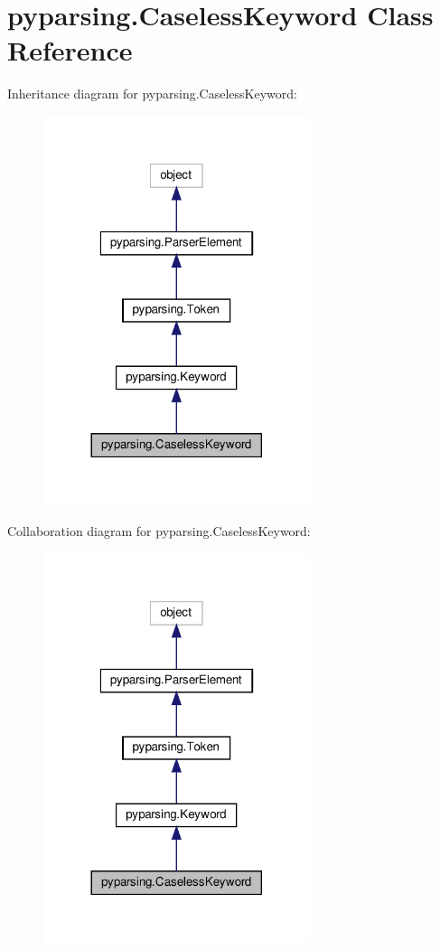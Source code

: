 \hypertarget{classpyparsing_1_1CaselessKeyword}{}\section{pyparsing.\+Caseless\+Keyword Class Reference}
\label{classpyparsing_1_1CaselessKeyword}


Inheritance diagram for pyparsing.\+Caseless\+Keyword\+:
\nopagebreak
\begin{figure}[H]
\begin{center}
\leavevmode
\includegraphics[width=221pt]{classpyparsing_1_1CaselessKeyword__inherit__graph}
\end{center}
\end{figure}


Collaboration diagram for pyparsing.\+Caseless\+Keyword\+:
\nopagebreak
\begin{figure}[H]
\begin{center}
\leavevmode
\includegraphics[width=221pt]{classpyparsing_1_1CaselessKeyword__coll__graph}
\end{center}
\end{figure}
